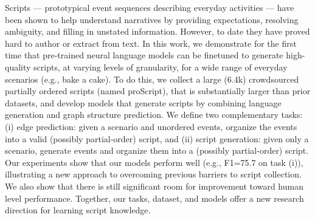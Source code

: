 Scripts --- prototypical event sequences describing everyday activities --- have been shown to help understand narratives by providing expectations, resolving ambiguity, and filling in unstated information. However, to date they have proved hard to author or extract from text. In this work, we demonstrate for the first time that pre-trained neural language models can be finetuned to generate high-quality scripts, at varying levels of granularity, for a wide range of everyday scenarios (e.g., bake a cake). To do this, we collect a large (6.4k) crowdsourced partially ordered scripts (named proScript), that is substantially larger than prior datasets, and develop models that generate scripts by combining language generation and graph structure prediction. We define two complementary tasks: (i) edge prediction: given a scenario and unordered events, organize the events into a valid (possibly partial-order) script, and (ii) script generation: given only a scenario, generate events and organize them into a (possibly partial-order) script. Our experiments show that our models perform well (e.g., F1=75.7 on task (i)), illustrating a new approach to overcoming previous barriers to script collection. We also show that there is still significant room for improvement toward human level performance. Together, our tasks, dataset, and models offer a new research direction for learning script knowledge.
